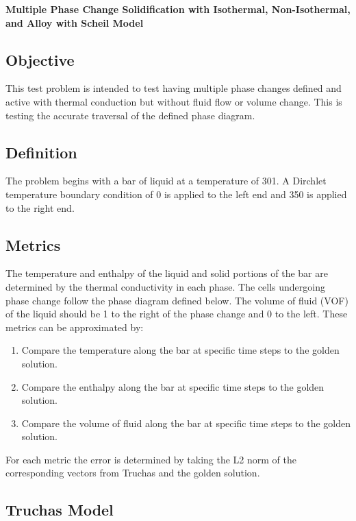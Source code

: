 \documentclass[12pt]{article}
\begin{document}
\begin{center}
{\large {\bf Multiple Phase Change Solidification with Isothermal, Non-Isothermal, and Alloy with Scheil Model}}
\end{center}

\subsection*{Objective}

This test problem is intended to test having multiple phase changes defined and active with thermal conduction but without fluid flow or volume change.  This is testing the accurate traversal of the defined phase diagram.

\subsection*{Definition}

The problem begins with a bar of liquid at a temperature of 301.  A Dirchlet temperature boundary condition of 0 is applied to the left end and 350 is applied to the right end. 

\subsection*{Metrics}

The temperature and enthalpy of the liquid and solid portions of the bar are determined by the thermal conductivity in each phase.  The cells undergoing phase change follow the phase diagram defined below.  The volume of fluid (VOF) of the liquid should be 1 to the right of the phase change and 0 to the left.  These metrics can be approximated by:

\begin{enumerate}
\item Compare the temperature along the bar at specific time steps to the golden solution.
\item Compare the enthalpy along the bar at specific time steps to the golden solution.
\item Compare the volume of fluid along the bar at specific time steps to the golden solution.
\end{enumerate}

For each metric the error is determined by taking the L2 norm of the corresponding vectors from Truchas and the golden solution.

\subsection*{Truchas Model}
\end{document}
